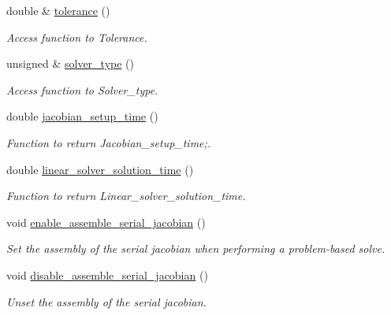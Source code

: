 \begin{DoxyCompactItemize}
double \& \hyperlink{classoomph_1_1TrilinosAztecOOSolver_afc08e5d6996fe05b93d68ff3cec6a478}{tolerance} ()
\begin{DoxyCompactList}\small\item\em Access function to Tolerance. \end{DoxyCompactList}\item 
unsigned \& \hyperlink{classoomph_1_1TrilinosAztecOOSolver_a9169831da7460eec52071e8b3938bf97}{solver\+\_\+type} ()
\begin{DoxyCompactList}\small\item\em Access function to Solver\+\_\+type. \end{DoxyCompactList}\item 
double \hyperlink{classoomph_1_1TrilinosAztecOOSolver_a3b7cf9349909686e3638aced9b29303f}{jacobian\+\_\+setup\+\_\+time} ()
\begin{DoxyCompactList}\small\item\em Function to return Jacobian\+\_\+setup\+\_\+time;. \end{DoxyCompactList}\item 
double \hyperlink{classoomph_1_1TrilinosAztecOOSolver_a88cf6614457b404e38c6aed2e5d41257}{linear\+\_\+solver\+\_\+solution\+\_\+time} ()
\begin{DoxyCompactList}\small\item\em Function to return Linear\+\_\+solver\+\_\+solution\+\_\+time. \end{DoxyCompactList}\item 
void \hyperlink{classoomph_1_1TrilinosAztecOOSolver_a80de34d99eff7b2ad41af3e04229a55b}{enable\+\_\+assemble\+\_\+serial\+\_\+jacobian} ()
\begin{DoxyCompactList}\small\item\em Set the assembly of the serial jacobian when performing a problem-\/based solve. \end{DoxyCompactList}\item 
void \hyperlink{classoomph_1_1TrilinosAztecOOSolver_a9f79dc6d711d4052ee61cb305da226db}{disable\+\_\+assemble\+\_\+serial\+\_\+jacobian} ()
\begin{DoxyCompactList}\small\item\em Unset the assembly of the serial jacobian. \end{DoxyCompactList}\end{DoxyCompactItemize}
